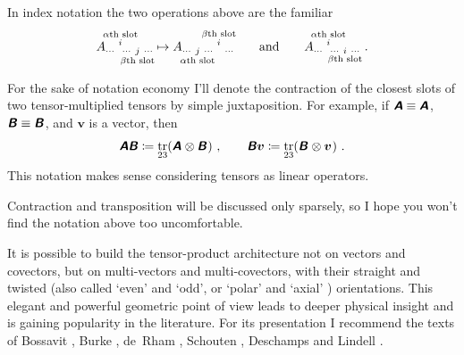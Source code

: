 \documentclass[\ifafour a4paper,12pt,\else a5paper,10pt,\fi%
onecolumn,oneside,article,%
british%
]{memoir}
\makeatletter
\newcommand*{\defquote}[1]{`#1'}
\theoremstyle{remark}
\theoremstyle{innote}
\newcommand*{\mathte}[1]{\textbf{\textit{\textsf{#1}}}}
\newcommand*{\citep}{\footcites}
\newcommand*{\citey}{\parencites*}%
\DeclareMathOperator{\tr}{tr}%
\newcommand*{\defd}{\coloneqq}
\renewcommand*{\|}[1][]{\nonscript\,#1\vert\nonscript\;\mathopen{}}
\newcommand*{\chap}{ch.}%
\newcommand*{\q}{}%
\DeclareRobustCommand*{\q}{%
  \mathbin{\mathpalette\bigcdot@{}}%
}
\newcommand*{\bigcdot@scalefactor}{0.7}
\newcommand*{\bigcdot@widthfactor}{1.5}
\newcommand*{\bigcdot@}[2]{%
  \sbox0{$#1\vcenter{}$}%
  \sbox2{$#1\cdot\m@th$}%
  \hbox to \bigcdot@widthfactor\wd2{%
    \hfil
    \raise\ht0\hbox{%
      \scalebox{\bigcdot@scalefactor}{%
        \lower\ht0\hbox{$#1\bullet\m@th$}%
      }%
    }%
    \hfil
  }%
}
\newcommand*{\yA}{\mathte{A}}
\newcommand*{\yB}{\mathte{B}}
\newcommand*{\yv}{\bm{v}}
\renewcommand*{\i}{\indices}
\makeatother
\begin{document}
In index notation the two operations above are the familiar
\begin{equation*}
  A\i{_{\dotsm\ }^{%
      \overset{\mathclap{\scriptstyle\text{$\alpha$th slot}}}{i}
    }_{\dotsm\ %
      \underset{\mathclap{\scriptstyle\text{$\beta$th slot}}}{j}
      \ \dotsm}}
  \mapsto
  A\i{_{\dotsm\ %
      \underset{\mathclap{\scriptstyle\text{$\alpha$th slot}}}{j}
      \ \dotsm\ }^{%
      \overset{\mathclap{\scriptstyle\text{$\beta$th slot}}}{i}
    }_{\ \dotsm}} 
  \qquad\text{and}\qquad
  A\i{_{\dotsm\ }^{%
      \overset{\mathclap{\scriptstyle\text{$\alpha$th slot}}}{i}
    }_{\dotsm\ %
      \underset{\mathclap{\scriptstyle\text{$\beta$th slot}}}{i}
      \ \dotsm}} \ .
\end{equation*}

For the sake of notation economy I'll denote the contraction of the closest
slots of two tensor-multiplied tensors by simple juxtaposition. For
example, if $\yA \equiv \yA\i{_{\q}^{\q}}$, $\yB \equiv \yB\i{_{\q\q}}$,
and $\yv$ is a vector, then
\begin{equation}
  \label{eq:simple_contraction}
  \yA\yB \defd \tr_{23}(\yA\i{_{\q}^{\q}}\otimes\yB\i{_{\q\q}})\ ,
  \qquad
  \yB\yv \defd \tr_{23}(\yB\i{_{\q\q}} \otimes \yv\i{^{\q}}) \ .
\end{equation}
This notation makes sense considering tensors as linear operators.

Contraction and transposition will be discussed only sparsely, so I hope
you won't find the notation above too uncomfortable.


\bigskip


It is possible to build the tensor-product architecture not on vectors and
covectors, but on multi-vectors and multi-covectors, with their straight
and twisted (also called \defquote{even} and
\defquote{odd}, %
or \defquote{polar} and \defquote{axial}%
) orientations. This elegant and powerful geometric point of view leads to
deeper physical insight and is gaining popularity in the literature. For
its presentation I recommend the texts of Bossavit \citey[especially
\chap~3]{bossavit1991}, Burke
\citey{burke1983,burke1985_r1987,burke1980b,burke1995}, de~Rham
\citey[\chap~2]{derham1955_t1984}, Schouten \citey{schouten1924_r1954},
Deschamps \citey{deschamps1970,deschamps1981} and Lindell
\citey{lindell2004}.
\end{document}

